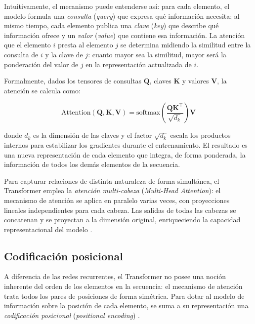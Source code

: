 Intuitivamente, el mecanismo puede entenderse así: para cada elemento,
el modelo formula una \textit{consulta} (\textit{query}) que expresa qué
información necesita; al mismo tiempo, cada elemento publica una
\textit{clave} (\textit{key}) que describe qué información ofrece y un
\textit{valor} (\textit{value}) que contiene esa información. La atención
que el elemento $i$ presta al elemento $j$ se determina midiendo la
similitud entre la consulta de $i$ y la clave de $j$: cuanto mayor sea
la similitud, mayor será la ponderación del valor de $j$ en la
representación actualizada de $i$.

Formalmente, dados los tensores de consultas $\mathbf{Q}$, claves
$\mathbf{K}$ y valores $\mathbf{V}$, la atención se calcula como:

\begin{equation}
    \text{Attention}(\mathbf{Q}, \mathbf{K}, \mathbf{V}) =
    \text{softmax}\!\left(
    \frac{\mathbf{Q}\mathbf{K}^{\top}}{\sqrt{d_k}}
    \right)\mathbf{V}
    \label{eq:attention}
\end{equation}

donde $d_k$ es la dimensión de las claves y el factor $\sqrt{d_k}$ escala
los productos internos para estabilizar los gradientes durante el
entrenamiento. El resultado es una nueva representación de cada elemento
que integra, de forma ponderada, la información de todos los demás
elementos de la secuencia.

Para capturar relaciones de distinta naturaleza de forma simultánea, el
Transformer emplea la \textit{atención multi-cabeza}
(\textit{Multi-Head Attention}): el mecanismo de atención se aplica en
paralelo varias veces, con proyecciones lineales independientes para cada
cabeza. Las salidas de todas las cabezas se concatenan y se proyectan a
la dimensión original, enriqueciendo la capacidad representacional del
modelo \cite{vaswani2017attention}.

\subsection{Codificación posicional}

A diferencia de las redes recurrentes, el Transformer no posee una
noción inherente del orden de los elementos en la secuencia: el mecanismo
de atención trata todos los pares de posiciones de forma simétrica. Para
dotar al modelo de información sobre la posición de cada elemento, se
suma a su representación una \textit{codificación posicional}
(\textit{positional encoding}) \cite{vaswani2017attention}.

